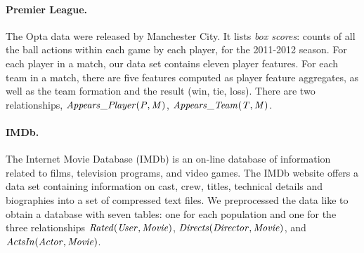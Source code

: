 {				\paragraph{Premier League.} 
				The Opta data were released by Manchester City. 
				It lists {\em box scores}: counts of all the ball actions within each game by each player, for the 2011-2012 season. 
				For each player in a match, our data set contains eleven player features.
				For each team in a match, there are five features computed as player feature aggregates, as well as the team formation and the result (win, tie, loss). 
				There are two relationships, $\it{Appears\_Player}(P,M)$, $\it{Appears\_Team}(T,M)$. 

				
				\paragraph{IMDb.} 
				The Internet Movie Database (IMDb) is an on-line database of information related to films, television programs, and video games.
				The IMDb website offers a data set containing information on cast, crew, titles, technical details and biographies into a set of compressed text files. 
				We preprocessed the data like \citet{Peralta2007} to obtain a database with seven tables: one for each population and one for the three relationships $\it{Rated}(\it{User},\it{Movie})$, $\it{Directs}(\it{Director},\it{Movie})$, and $\it{ActsIn}(\mathit{Actor},\it{Movie})$.
				
}
